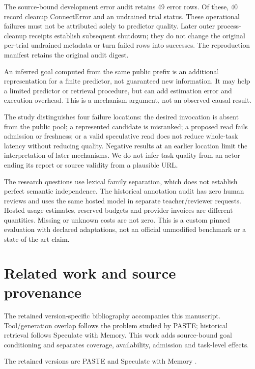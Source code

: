 \documentclass[10pt]{article}
\begin{document}
The source-bound development error audit retains 49 error rows. Of these, 40 record cleanup ConnectError and an undrained trial status. These operational failures must not be attributed solely to predictor quality. Later outer process-cleanup receipts establish subsequent shutdown; they do not change the original per-trial undrained metadata or turn failed rows into successes. The reproduction manifest retains the original audit digest.

An inferred goal computed from the same public prefix is an additional representation for a finite predictor, not guaranteed new information. It may help a limited predictor or retrieval procedure, but can add estimation error and execution overhead. This is a mechanism argument, not an observed causal result.

The study distinguishes four failure locations: the desired invocation is absent from the public pool; a represented candidate is misranked; a proposed read fails admission or freshness; or a valid speculative read does not reduce whole-task latency without reducing quality. Negative results at an earlier location limit the interpretation of later mechanisms. We do not infer task quality from an actor ending its report or source validity from a plausible URL.

The research questions use lexical family separation, which does not establish perfect semantic independence. The historical annotation audit has zero human reviews and uses the same hosted model in separate teacher/reviewer requests. Hosted usage estimates, reserved budgets and provider invoices are different quantities. Missing or unknown costs are not zero. This is a custom pinned evaluation with declared adaptations, not an official unmodified benchmark or a state-of-the-art claim.

\hypertarget{related-work-and-source-provenance}{%
\section{Related work and source provenance}\label{related-work-and-source-provenance}}

The retained version-specific bibliography accompanies this manuscript. Tool/generation overlap follows the problem studied by PASTE; historical retrieval follows Speculate with Memory. This work adds source-bound goal conditioning and separates coverage, availability, admission and task-level effects.

The retained versions are PASTE \citep{sui2026paste} and Speculate with Memory \citep{li2026memory}.

\begingroup\footnotesize\setlength{\parskip}{0pt}\setlength{\bibsep}{3pt plus 1pt minus 1pt}


\endgroup
\end{document}
